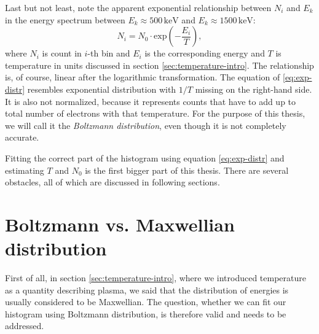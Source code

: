 Last but not least, note the apparent exponential relationship between $N_i$ and $E_k$ in the energy spectrum between $E_k \approx 500 \, \mathrm{keV}$ and $E_k \approx 1500 \, \mathrm{keV}$:
\begin{equation}
	\label{eq:exp-distr}
	N_i = N_0 \cdot \mathrm{exp}\left( -\frac{E_i}{T}\right)\mathrm{,}
\end{equation}
where $N_i$ is count in $i$-th bin and $E_i$ is the corresponding energy and $T$ is temperature in units discussed in section \ref{sec:temperature-intro}. The relationship is, of course, linear after the logarithmic transformation. The equation of \ref{eq:exp-distr} resembles exponential distribution with $1/T$ missing on the right-hand side. It is also not normalized, because it represents counts that have to add up to total number of electrons with that temperature. For the purpose of this thesis, we will call it the \textit{Boltzmann distribution}, even though it is not completely accurate.

Fitting the correct part of the histogram using equation \ref{eq:exp-distr} and estimating $T$ and $N_0$ is the first bigger part of this thesis. There are several obstacles, all of which are discussed in following sections.

\section{Boltzmann vs. Maxwellian distribution}
First of all, in section \ref{sec:temperature-intro}, where we introduced temperature as a quantity describing plasma, we said that the distribution of energies is usually considered to be Maxwellian. The question, whether we can fit our histogram using Boltzmann distribution, is therefore valid and needs to be addressed.

